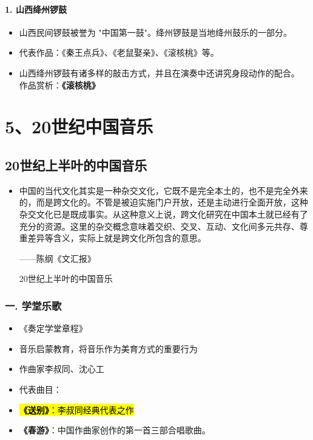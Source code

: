 \documentclass[
]{article}
\providecommand{\tightlist}{%
  \setlength{\itemsep}{0pt}\setlength{\parskip}{0pt}}
\begin{document}
\paragraph{1. 山西绛州锣鼓}\label{ux5c71ux897fux7edbux5ddeux9523ux9f13}

\begin{itemize}
\tightlist
\item
  山西民间锣鼓被誉为 "中国第一鼓"。绛州锣鼓是当地绛州鼓乐的一部分。
\item
  代表作品：《秦王点兵》、《老鼠娶亲》、《滚核桃》等。
\item
  山西绛州锣鼓有诸多样的敲击方式，并且在演奏中还讲究身段动作的配合。\\
  作品赏析：\textbf{《滚核桃》}
\end{itemize}

\section{5、20世纪中国音乐}\label{ux4e16ux7eaaux4e2dux56fdux97f3ux4e50}

\subsection{20世纪上半叶的中国音乐}\label{ux4e16ux7eaaux4e0aux534aux53f6ux7684ux4e2dux56fdux97f3ux4e50}

\begin{itemize}
\item
  中国的当代文化其实是一种杂交文化，它既不是完全本土的，也不是完全外来的，而是跨文化的。不管是被迫实施门户开放，还是主动进行全面开放，这种杂交文化已是既成事实。从这种意义上说，跨文化研究在中国本土就已经有了充分的资源。这里的杂交概念意味着交织、交叉、互动、文化间多元共存、尊重差异等含义，实际上就是跨文化所包含的意思。

  ------陈纲《文汇报》

  20世纪上半叶的中国音乐
\end{itemize}

\subsubsection{一. 学堂乐歌}\label{ux4e00.-ux5b66ux5802ux4e50ux6b4c}

\begin{itemize}
\item
  《奏定学堂章程》
\item
  音乐启蒙教育，将音乐作为美育方式的重要行为
\item
  作曲家李叔同、沈心工
\item
  代表曲目：
\item
  \hl{\mbox{\textbf{《送别》}：李叔同经典代表之作}}
\item
  \textbf{《春游》}：中国作曲家创作的第一首三部合唱歌曲。
\end{itemize}
\end{document}

